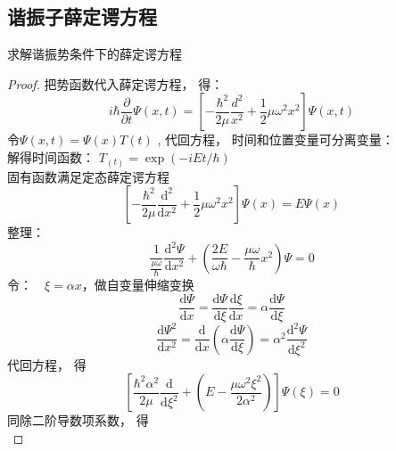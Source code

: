 \subsection{谐振子薛定谔方程}
\begin{example} %
求解谐振势条件下的薛定谔方程\\
\end{example}
\begin{proof}
把势函数代入薛定谔方程， 得： 
\begin{equation*}
	i\hbar \frac{\partial }{\partial t} \Psi (x,t ) =[ -\frac{\hbar^2}{2\mu } \frac{d ^2}{x^2} + \frac{1}{2} \mu \omega ^2 x^2   ] \Psi (x, t ) 
\end{equation*}
令$\Psi (x,t) =\Psi(x) T(t) $ ,  代回方程， 时间和位置变量可分离变量：\\
解得时间函数： $T_(t)  = \exp(-i E t /\hbar) $ \\
固有函数满足定态薛定谔方程\\
\begin{equation*}
	\left [ -\frac{\hbar^2}{2\mu} \frac{\mathrm{d} ^2}{\mathrm{d} x^2} +\frac{1}{2}\mu \omega^2 x^2  \right ]\Psi(x)=E\Psi(x) 
\end{equation*}
整理：\\
\begin{equation*}
\frac{1}{\frac{\mu\omega}{\hbar}} \frac{\mathrm{d} ^2\Psi}{\mathrm{d} x^2} +	\left ( \frac{2E}{\omega \hbar} -\frac{\mu \omega}{\hbar} x^2 \right )\Psi=0
\end{equation*}
令：~~$ \xi =\alpha x$，做自变量伸缩变换 \\
\begin{equation*}
\frac{\mathrm{d} \Psi}{\mathrm{d} x} =\frac{\mathrm{d} \Psi}{\mathrm{d} \xi} \frac{\mathrm{d} \xi}{\mathrm{d} x}  = \alpha \frac{\mathrm{d} \Psi}{\mathrm{d} \xi}
\end{equation*}
\begin{equation*}
	\frac{\mathrm{d} \Psi ^2 }{\mathrm{d} x ^2} =\frac{\mathrm{d}}{\mathrm{d} x}  ( \alpha \frac{\mathrm{d} \Psi}{\mathrm{d} \xi} ) = \alpha ^2 \frac{\mathrm{d} ^2 \Psi}{\mathrm{d} \xi ^2} 
\end{equation*}
代回方程， 得\\
\begin{equation*}
	\left[ \frac{\hbar ^2 \alpha ^2 }{2\mu} \frac{\mathrm{d}}{\mathrm{d} \xi ^2}  + (E- \frac{\mu \omega ^2 \xi ^2}{2 \alpha ^2}  ) \right] \Psi(\xi) =0
\end{equation*}
同除二阶导数项系数， 得\\
\begin{equation*}

\end{equation*}
\end{proof}
